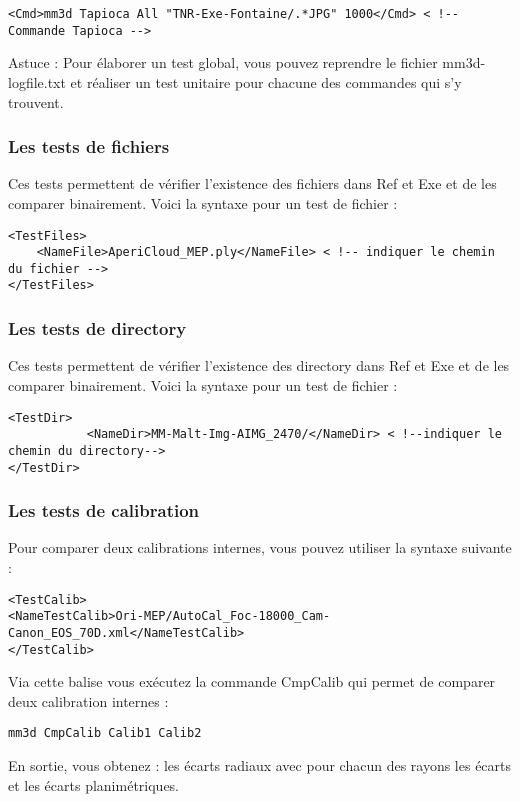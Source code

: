 \documentclass[a4paper]{book}
\begin{document}
\begin{verbatim}
<Cmd>mm3d Tapioca All "TNR-Exe-Fontaine/.*JPG" 1000</Cmd> < !-- Commande Tapioca -->
\end{verbatim}

Astuce : Pour \'elaborer un test global, vous pouvez reprendre le fichier mm3d-logfile.txt et r\'ealiser un test unitaire pour chacune des commandes qui s'y trouvent.

\subsubsection{Les tests de fichiers}
Ces tests permettent de v\'erifier l’existence des fichiers dans Ref et Exe et de les comparer binairement. Voici la syntaxe pour un test de fichier :

\begin{verbatim}
<TestFiles> 
	<NameFile>AperiCloud_MEP.ply</NameFile> < !-- indiquer le chemin du fichier --> 
</TestFiles>
\end{verbatim}

\subsubsection{Les tests de directory}
Ces tests permettent de v\'erifier l’existence des directory dans Ref et Exe et de les comparer binairement. Voici la syntaxe pour un test de fichier :

\begin{verbatim}
<TestDir> 
           <NameDir>MM-Malt-Img-AIMG_2470/</NameDir> < !--indiquer le chemin du directory-->
</TestDir>
\end{verbatim}

\subsubsection{Les tests de calibration}
Pour comparer deux calibrations internes, vous pouvez utiliser la syntaxe suivante :

\begin{verbatim}
<TestCalib> 
<NameTestCalib>Ori-MEP/AutoCal_Foc-18000_Cam-Canon_EOS_70D.xml</NameTestCalib> 
</TestCalib>
\end{verbatim}

Via cette balise vous ex\'ecutez la commande CmpCalib qui permet de comparer deux calibration internes :
\begin{verbatim}
mm3d CmpCalib Calib1 Calib2
\end{verbatim}
En sortie, vous obtenez : les \'ecarts radiaux avec pour chacun des rayons les \'ecarts et les \'ecarts planim\'etriques.
\end{document}
